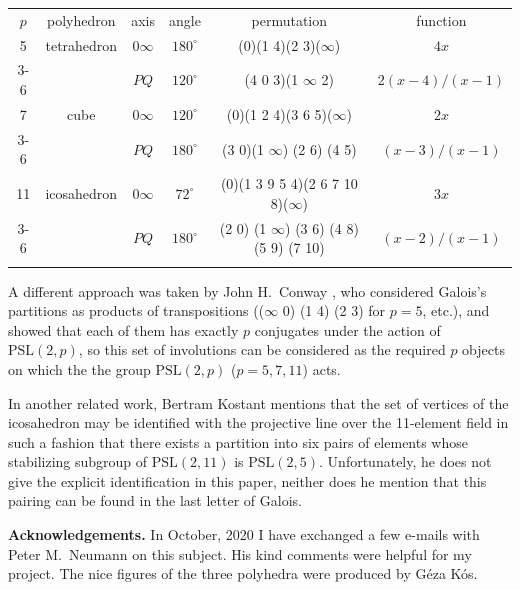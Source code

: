 \documentclass[reqno,12pt]{amsart}
\theoremstyle{definition}
\newcommand{\PSL}{\mathrm{PSL}}
\begin{document}
\begin{center}
\begin{tabular}{|c|c|c|c|c|c|}
  \hhline{|=|=|=|=|=|=|}
  $p$ &polyhedron &axis &angle &permutation & function \\
  \hhline{|=|=|=|=|=|=|}
  5 &tetrahedron & $0\infty$ & $180^\circ$ & (0)(1 4)(2 3)($\infty$) &$4x$ \\
  \cline{3-6}
   & &$PQ$  &$120^\circ$ &(4 0 3)(1 $\infty$ 2) &$2(x-4)/(x-1)$ \\
  \hhline{|=|=|=|=|=|=|}
  7 &cube & $0\infty$ &$120^\circ$ & (0)(1 2 4)(3 6 5)($\infty$) & $2x$ \\
  \cline{3-6}
   & &$PQ$ &$180^\circ$ &(3 0)(1 $\infty$) (2 6) (4 5) &$(x-3)/(x-1)$  \\
  \hhline{|=|=|=|=|=|=|}
  11 &icosahedron & $0\infty$  &$72^\circ$ &(0)(1 3 9 5 4)(2 6 7 10 8)($\infty$) & $3x$ \\
  \cline{3-6}
  & &$PQ$ &$180^\circ$  &(2 0) (1 $\infty$) (3 6) (4 8) (5 9) (7 10) & $(x-2)/(x-1)$ \\
  \hhline{|=|=|=|=|=|=|}
\end{tabular}
\end{center}

A different approach was taken by John H.\ Conway \cite{Conway}, who considered Galois's partitions
as products of transpositions (($\infty$ 0) (1 4) (2 3) for $p=5$, etc.), and showed that each of them has
exactly $p$ conjugates under the action of $\PSL(2,p)$, so this set of involutions can be considered
as the required $p$ objects on which the the group $\PSL(2,p)$ ($p=5,7,11$) acts.

In another related work, Bertram Kostant \cite[p.~364]{Kostant} mentions that the set of vertices of the icosahedron
may be identified with the projective line over the 11-element field in such a fashion that there exists a partition
into six pairs of elements whose stabilizing subgroup of $\PSL(2,11)$ is $\PSL(2,5)$. Unfortunately, he does not
give the explicit identification in this paper, neither does he mention that this pairing can be found in
the last letter of Galois.

\medskip

{\bf Acknowledgements.} In October, 2020 I have exchanged a few e-mails with Peter M.\ Neumann
on this subject. His kind comments were helpful for my project. The nice figures of the three
polyhedra were produced by G\'eza K\'os.
\end{document}
